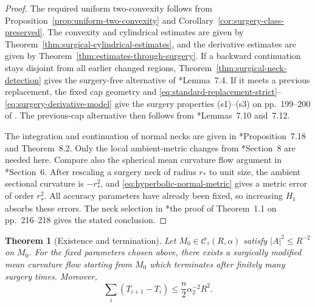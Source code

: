 \documentclass[11pt,reqno]{amsart}
\newtheorem{theorem}[proposition]{Theorem}
\theoremstyle{definition}
\theoremstyle{remark}
\numberwithin{equation}{section}
\newcommand{\CC}{\mathcal C}
\begin{document}
\begin{proof}
The required uniform two-convexity follows from
Proposition~\ref{prop:uniform-two-convexity} and
Corollary~\ref{cor:surgery-class-preserved}.  The convexity and cylindrical
estimates are given by Theorem~\ref{thm:surgical-cylindrical-estimates}, and
the derivative estimates are given by
Theorem~\ref{thm:estimates-through-surgery}.  If a backward continuation stays
disjoint from all earlier changed regions, Theorem~\ref{thm:surgical-neck-detection}
gives the surgery-free alternative of \cite{HS09}*{Lemma~7.4}.  If it meets a
previous replacement, the fixed cap geometry and
\eqref{eq:standard-replacement-strict}--\eqref{eq:surgery-derivative-model}
give the surgery properties \textup{(s1)--(s3)} on pp.~199--200 of \cite{HS09}.  The previous-cap
alternative then follows from \cite{HS09}*{Lemmas~7.10 and~7.12}.

The integration and continuation of normal necks are given in
\cite{HS09}*{Proposition~7.18 and Theorem~8.2}.  Only the local
ambient-metric changes from \cite{BH17}*{Section~8} are needed here.  Compare
also the spherical mean curvature flow argument in
\cite{LN21}*{Section~6}.  After rescaling a surgery neck of radius $r_*$ to
unit size, the ambient sectional curvature is $-r_*^2$, and
\eqref{eq:hyperbolic-normal-metric} gives a metric error of order $r_*^2$.
All accuracy parameters have already been fixed, so increasing $H_1$ absorbs
these errors.  The neck selection in
\cite{HS09}*{the proof of Theorem~1.1 on pp.~216--218} gives the stated
conclusion.
\end{proof}


\begin{theorem}[Existence and termination]
  \label{thm:terminating-surgery-flow}
  Let $M_0\in\CC_\tau(R,\alpha)$ satisfy $ |A|^2\leq R^{-2}$ on $M_0$.  
  For the fixed parameters chosen above, there exists a surgically modified
  mean curvature flow starting from $M_0$ which terminates after finitely
  many surgery times.  Moreover,
  \begin{equation}\label{eq:terminating-flow-time}
    \sum_i(T_{i+1}-T_i)
    \leq
    \frac n2\alpha_2^{-2}R^2.
  \end{equation}
\end{theorem}
\end{document}
